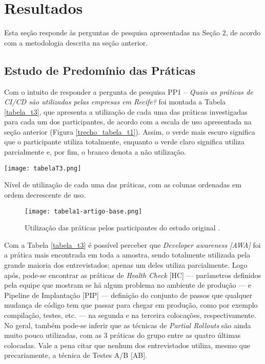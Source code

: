 \section{Resultados}

Esta seção responde às perguntas de pesquisa apresentadas na Seção 2, de acordo com a metodologia descrita na seção anterior.

\subsection{Estudo de Predomínio das Práticas}

Com o intuito de responder a pergunta de pesquisa PP1 -- \emph{Quais as práticas de CI/CD são utilizadas pelas empresas em Recife?} foi montada a Tabela \ref{tabela_t3}, que apresenta a utilização de cada uma das práticas investigadas para cada um dos participantes, de acordo com a escala de uso apresentada na seção anterior (Figura \ref{trecho_tabela_t1}). Assim, o verde mais escuro significa que o participante utiliza totalmente, enquanto o verde claro significa utiliza parcialmente e, por fim, o branco denota a não utilização.

\begin{table}[ht]
\begin{center}
\texttt{[image: tabelaT3.png]}
\end{center}
\caption[Nível de utilização das práticas, com as colunas em ordem decrescente de uso]{
    Nível de utilização de cada uma das práticas, com as colunas ordenadas em ordem decrescente de uso.
}\label{tabela_t3}
\end{table}

\begin{figure}[ht]
\begin{center}
\texttt{[image: tabela1-artigo-base.png]}
\end{center}
\caption[Tabela 1 do estudo original]{
    Utilização das práticas pelos participantes do estudo original \cite{empiricalStudy2016}.
}\label{tabela_1_artigo_base}
\end{figure}

Com a Tabela \ref{tabela_t3} é possível perceber que \emph{Developer awareness [AWA]} foi a prática mais encontrada em toda a amostra, sendo totalmente utilizada pela grande maioria dos entrevistados; apenas um deles utiliza parcialmente. Logo após, pode-se encontrar as práticas de \emph{Health Check} [HC] --- parâmetros definidos pela equipe que mostram se há algum problema no ambiente de produção --- e Pipeline de Implantação [PIP] --- definição do conjunto de passos que qualquer mudança de código tem que passar para chegar em produção, como por exemplo compilação, testes, etc. --- na segunda e na terceira colocações, respectivamente. No geral, também pode-se inferir que as técnicas de \emph{Partial Rollouts} são ainda muito pouco utilizadas, com as 3 práticas do grupo entre as quatro últimas colocadas. Vale a pena citar que nenhum dos entrevistados utiliza, mesmo que precariamente, a técnica de Testes A/B [AB].

